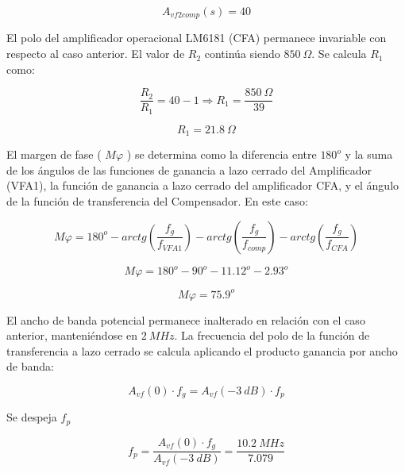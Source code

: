 \begin{equation}
    \boxed{
    A_{vf2 comp} (s) = 40
    }
\end{equation}

\hspace{1mm} El polo del amplificador operacional LM6181 (CFA) permanece invariable con respecto al caso anterior. El valor de \(R_2\) continúa siendo \(850~\Omega\). Se calcula \(R_1\) como:

\begin{equation}
    \frac{R_2}{R_1} = 40 - 1 \Longrightarrow R_1 = \frac{850~\Omega}{39}
\end{equation}

\begin{equation}
    \boxed{
    R_1 = 21.8~\Omega
    }
\end{equation}

\hspace{1mm} El margen de fase ( \(M\varphi\) ) se determina como la diferencia entre \(180^o\) y la suma de los ángulos de las funciones de ganancia a lazo cerrado del Amplificador (VFA1), la función de ganancia a lazo cerrado del amplificador CFA, y el ángulo de la función de transferencia del Compensador. En este caso:

\begin{equation}
    M\varphi = 180^o - arctg \left(  \frac{f_g}{f_{VFA1}}\right) - arctg \left( \frac{f_g}{f_{comp}} \right) - arctg \left( \frac{f_g}{f_{CFA}} \right)
\end{equation}

\begin{equation}
   M\varphi = 180^o - 90^o - 11.12^o - 2.93^o
\end{equation}

\begin{equation}
    \boxed{
    M\varphi = 75.9^o
    }
\end{equation}

\hspace{1mm} El ancho de banda potencial permanece inalterado en relación con el caso anterior, manteniéndose en \(2~MHz\). La frecuencia del polo de la función de transferencia a lazo cerrado se calcula aplicando el producto ganancia por ancho de banda:

\begin{equation}
    A_{vf} (0) \cdot f_g = A_{vf}(-3~dB) \cdot f_p
\end{equation}

 Se despeja \(f_p\)

\begin{equation}
    f_p = \frac{A_{vf} (0) \cdot f_g}{A_{vf}(-3~dB)} = \frac{10.2~MHz}{7.079}
\end{equation}

